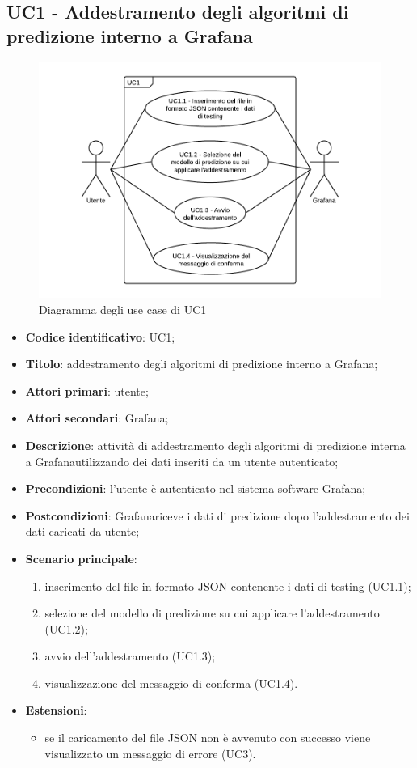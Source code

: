 \subsection{UC1 - Addestramento degli algoritmi di predizione interno a Grafana}
\begin{figure}[H]
\includegraphics{img/UC1 - Addestramento degli algoritmi di predizione interno a Grafana.png}
\caption{Diagramma degli use case di UC1}
\end{figure}
\begin{itemize}
	\item \textbf{Codice identificativo}: UC1;
	\item \textbf{Titolo}: addestramento degli algoritmi di predizione interno a Grafana\glo;
	\item \textbf{Attori primari}: utente;
	\item \textbf{Attori secondari}: Grafana\glo;
	\item \textbf{Descrizione}: attività di addestramento degli algoritmi di predizione interna a Grafana\glosp utilizzando dei dati inseriti da un utente autenticato;
	\item \textbf{Precondizioni}: l'utente è autenticato nel sistema software Grafana\glo;
	\item \textbf{Postcondizioni}: Grafana\glosp riceve i dati di predizione dopo l'addestramento dei dati caricati da utente;
	\item \textbf{Scenario principale}: 
		\begin{enumerate}
			\item inserimento del file in formato JSON contenente i dati di testing (UC1.1);
			\item selezione del modello di predizione su cui applicare l'addestramento (UC1.2);
			\item avvio dell'addestramento (UC1.3);
			\item visualizzazione del messaggio di conferma (UC1.4).
		\end{enumerate}
	\item \textbf{Estensioni}:
	\begin{itemize}
		\item se il caricamento del file JSON non è avvenuto con successo viene visualizzato un messaggio di errore (UC3).
	\end{itemize}
\end{itemize}

